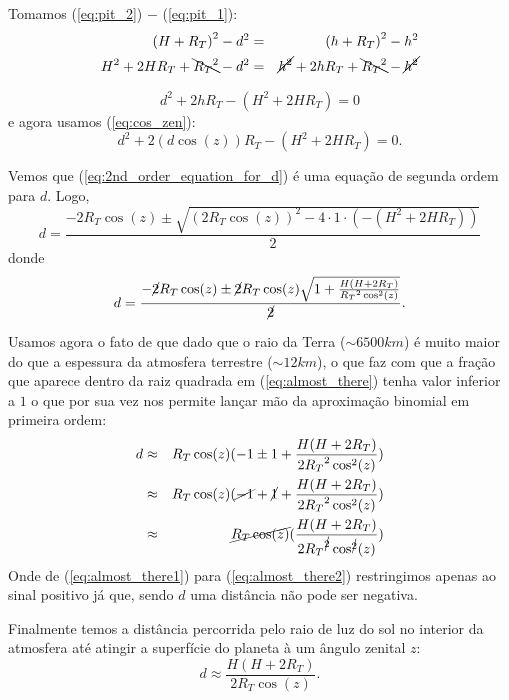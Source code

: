 \documentclass[12pt,a4paper]{article}
\begin{document}
	Tomamos (\ref{eq:pit_2})  $-$ (\ref{eq:pit_1}):
	\begin{eqnarray}
		{(H + R_T)}^2 - d^2 &=& {(h + R_T)}^2 - h^2 \\
		H^2 + 2 H R_T + \bcancel{{R_T}^2} - d^2 &=& \cancel{h^2}  + 2 h R_T + \bcancel{{R_T}^2} - \cancel{h^2} 
	\end{eqnarray}

	\begin{equation}
		 d^2 + 2 h R_T - (H^2 + 2 H R_T) = 0
	\end{equation}
	e agora usamos (\ref{eq:cos_zen}):
	\begin{equation}
		 d^2 + 2 (d\cos(z)) R_T - (H^2 + 2 H R_T) = 0. \label{eq:2nd_order_equation_for_d}
	\end{equation}

	Vemos que (\ref{eq:2nd_order_equation_for_d}) é uma equação de segunda ordem para $d$. Logo, 
	\begin{equation}
		d = \frac{-2R_T\cos(z) \pm \sqrt{ {(2R_T\cos(z))}^2-4\cdot 1 \cdot (-(H^2 + 2H R_T)) }}{2}	
	\end{equation}
	donde
	\begin{equation}
		d = \frac{-\cancel{2}R_T\cos(z) \pm \cancel{2}R_T\cos(z)\sqrt{ 1 +  \frac{H(H + 2R_T)}{{R_T}^2\cos^2(z)} }}{\cancel{2}}	.
		\label{eq:almost_there}
	\end{equation}

	Usamos agora o fato de que dado que o raio da Terra ($\sim 6500 km$) é
	muito maior do que a espessura da atmosfera terrestre ($\sim 12 km$), o que
	faz com que a fração que aparece dentro da raiz quadrada em
	(\ref{eq:almost_there}) tenha valor inferior a $1$ o que por sua vez nos
	permite lançar mão da aproximação binomial em primeira ordem:
	\begin{eqnarray}
		d &\approx& R_T\cos(z)(-1 \pm { 1 + \frac{H(H + 2R_T)}{2{R_T}^2\cos^2(z)}}) \label{eq:almost_there1}\\
		  &\approx& R_T\cos(z)(\cancel{-1} + \cancel{1} + \frac{H(H + 2R_T)}{2{R_T}^2\cos^2(z)}) \label{eq:almost_there2}\\
		  &\approx& \cancel{R_T\cos(z)}(\frac{H(H + 2R_T)}{2{R_T}^{\cancel{2}}\cos^{\cancel{2}}(z)})
	\end{eqnarray}
	Onde de (\ref{eq:almost_there1}) para (\ref{eq:almost_there2}) restringimos
	apenas ao sinal positivo já que, sendo $d$ uma distância não pode ser
	negativa.

	Finalmente temos a distância percorrida pelo raio de luz do sol
	no interior da atmosfera até atingir a superfície do planeta à um ângulo
	zenital $z$:
	\begin{equation}
		 \boxed{d \approx \frac{H(H + 2R_T)}{2{R_T}\cos(z)}.} 
	\end{equation}
\end{document}
